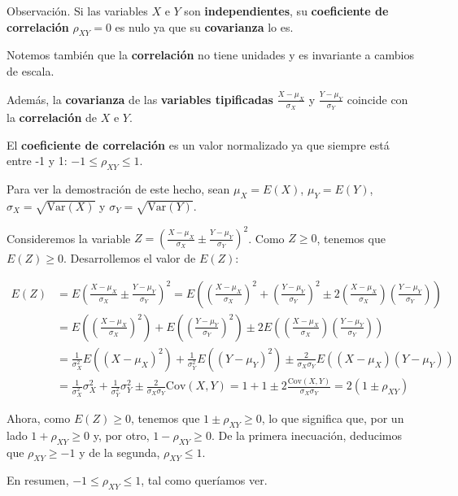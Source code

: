 \documentclass[]{book}
\begin{document}
Observación.
Si las variables \(X\) e \(Y\) son \textbf{independientes}, su \textbf{coeficiente de correlación} \(\rho_{XY}=0\) es nulo ya que su \textbf{covarianza} lo es.

Notemos también que la \textbf{correlación} no tiene unidades y es invariante a cambios de escala.

Además, la \textbf{covarianza} de las \textbf{variables tipificadas} \(\frac{X-\mu_X}{\sigma_X}\) y \(\frac{Y-\mu_Y}{\sigma_Y}\) coincide con la \textbf{correlación} de \(X\) e \(Y\).

El \textbf{coeficiente de correlación} es un valor normalizado ya que siempre está entre -1 y 1: \(-1\leq\rho_{XY}\leq 1\).

Para ver la demostración de este hecho, sean \(\mu_X=E(X)\), \(\mu_Y=E(Y)\), \(\sigma_X=\sqrt{\mathrm{Var}(X)}\) y \(\sigma_Y=\sqrt{\mathrm{Var}(Y)}\).

Consideremos la variable \(Z=\left(\frac{X-\mu_X}{\sigma_X}\pm \frac{Y-\mu_Y}{\sigma_Y}\right)^2\). Como \(Z\geq 0\), tenemos que \(E(Z)\geq 0\). Desarrollemos el valor de \(E(Z)\):

\[
\begin{array}{rl}
E(Z) & = E\left(\frac{X-\mu_X}{\sigma_X}\pm \frac{Y-\mu_Y}{\sigma_Y}\right)^2 = E\left(\left(\frac{X-\mu_X}{\sigma_X}\right)^2+\left(\frac{Y-\mu_Y}{\sigma_Y}\right)^2\pm 2\left(\frac{X-\mu_X}{\sigma_X}\right) \left(\frac{Y-\mu_Y}{\sigma_Y}\right)\right) \\ & =
E\left(\left(\frac{X-\mu_X}{\sigma_X}\right)^2\right)+E\left(\left(\frac{Y-\mu_Y}{\sigma_Y}\right)^2\right)\pm 2 E\left(\left(\frac{X-\mu_X}{\sigma_X}\right) \left(\frac{Y-\mu_Y}{\sigma_Y}\right)\right) \\ & =
\frac{1}{\sigma_X^2}E\left(\left(X-\mu_X\right)^2\right)+\frac{1}{\sigma_Y^2}E\left(\left(Y-\mu_Y\right)^2\right)\pm \frac{2}{\sigma_X\sigma_Y}E\left(\left(X-\mu_X\right) \left(Y-\mu_Y\right)\right) \\ & = \frac{1}{\sigma_X^2}\sigma_X^2+
\frac{1}{\sigma_Y^2}\sigma_Y^2 \pm\frac{2}{\sigma_X\sigma_Y} \mathrm{Cov}(X,Y) = 1+1\pm 2\frac{\mathrm{Cov}(X,Y)}{\sigma_X\sigma_Y}=2(1\pm\rho_{XY})
\end{array}
\]

Ahora, como \(E(Z)\geq 0\), tenemos que \(1\pm \rho_{XY}\geq 0\), lo que significa que, por un lado \(1+\rho_{XY}\geq 0\) y, por otro, \(1-\rho_{XY}\geq 0\). De la primera inecuación, deducimos que \(\rho_{XY}\geq -1\) y de la segunda, \(\rho_{XY}\leq 1\).

En resumen, \(-1\leq\rho_{XY}\leq 1\), tal como queríamos ver.
\end{document}
